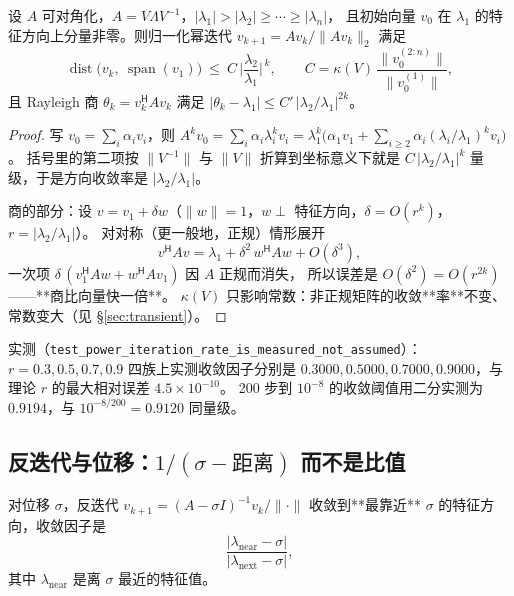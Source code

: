 \begin{theorem}[幂法的收敛率]
\label{thm:power}
设 $A$ 可对角化，$A=V\Lambda V^{-1}$，$|\lambda_1|>|\lambda_2|\ge\cdots\ge|\lambda_n|$，
且初始向量 $v_0$ 在 $\lambda_1$ 的特征方向上分量非零。则归一化幂迭代
$v_{k+1}=Av_k/\|Av_k\|_2$ 满足
\[
  \operatorname{dist}\!\big(v_k,\ \operatorname{span}(v_1)\big)\ \le\ C\,\Big|\frac{\lambda_2}{\lambda_1}\Big|^{\,k},
  \qquad C=\kappa(V)\,\frac{\|v_0^{(2:n)}\|}{\|v_0^{(1)}\|},
\]
且 Rayleigh 商 $\theta_k=v_k^{\mathsf H}Av_k$ 满足
$|\theta_k-\lambda_1|\le C'\,|\lambda_2/\lambda_1|^{2k}$。
\end{theorem}

\begin{proof}
写 $v_0=\sum_i\alpha_iv_i$，则 $A^kv_0=\sum_i\alpha_i\lambda_i^kv_i
=\lambda_1^k\big(\alpha_1v_1+\sum_{i\ge2}\alpha_i(\lambda_i/\lambda_1)^kv_i\big)$。
括号里的第二项按 $\|V^{-1}\|$ 与 $\|V\|$ 折算到坐标意义下就是
$C\,|\lambda_2/\lambda_1|^k$ 量级，于是方向收敛率是 $|\lambda_2/\lambda_1|$。

商的部分：设 $v=v_1+\delta w$（$\|w\|=1$，$w\perp$ 特征方向，$\delta=O(r^k)$，$r=|\lambda_2/\lambda_1|$）。
对对称（更一般地，正规）情形展开
\[
  v^{\mathsf H}Av=\lambda_1+\delta^2\,w^{\mathsf H}Aw+O(\delta^3),
\]
一次项 $\delta\,(v_1^{\mathsf H}Aw+w^{\mathsf H}Av_1)$ 因 $A$ 正规而消失，
所以误差是 $O(\delta^2)=O(r^{2k})$——**商比向量快一倍**。
$\kappa(V)$ 只影响常数：非正规矩阵的收敛**率**不变、常数变大（见 \S\ref{sec:transient}）。
\end{proof}

实测（\texttt{test\_power\_iteration\_rate\_is\_measured\_not\_assumed}）：
$r=0.3,0.5,0.7,0.9$ 四族上实测收敛因子分别是
$0.3000,0.5000,0.7000,0.9000$，与理论 $r$ 的最大相对误差 $4.5\times10^{-10}$。
200 步到 $10^{-8}$ 的收敛阈值用二分实测为 $0.9194$，与 $10^{-8/200}=0.9120$ 同量级。

\subsection{反迭代与位移：$1/(\sigma-\text{距离})$ 而不是比值}

\begin{theorem}[反迭代的收敛率]
\label{thm:invit}
对位移 $\sigma$，反迭代 $v_{k+1}=(A-\sigma I)^{-1}v_k/\|\cdot\|$ 收敛到**最靠近** $\sigma$
的特征方向，收敛因子是
\[
  \frac{|\lambda_{\text{near}}-\sigma|}{|\lambda_{\text{next}}-\sigma|},
\]
其中 $\lambda_{\text{near}}$ 是离 $\sigma$ 最近的特征值。
\end{theorem}

